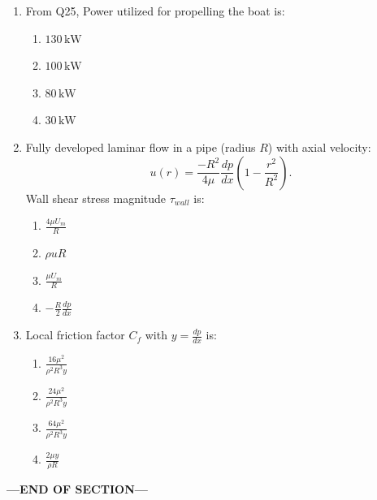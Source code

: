 \documentclass[journal,cmex10]{IEEEtran}
\theoremstyle{remark}
\numberwithin{equation}{enumi}
\numberwithin{figure}{enumi}
\begin{document}
\begin{enumerate}[label=\arabic*)]
\vspace{0.5cm}
\item From Q25, Power utilized for propelling the boat is:  
\hfill{}

\begin{enumerate}[label=\alph*)]
    \item $130\,\text{kW}$
    \item $100\,\text{kW}$
    \item $80\,\text{kW}$
    \item $30\,\text{kW}$
\end{enumerate}

\newpage
\item Fully developed laminar flow in a pipe (radius $R$) with axial velocity:  
\[
u(r) = \frac{-R^2}{4\mu} \frac{dp}{dx} \left(1 - \frac{r^2}{R^2}\right).
\]  
Wall shear stress magnitude $\tau_{wall}$ is:  
\hfill{}

\begin{enumerate}[label=\alph*)]
    \item $\frac{4 \mu U_m}{R}$
    \item $\rho u R$
    \item $\frac{\mu U_m}{R}$
    \item $-\frac{R}{2} \frac{dp}{dx}$
\end{enumerate}

\vspace{0.5cm}
\item Local friction factor $C_f$ with $y = \frac{dp}{dx}$ is:  
\hfill{}

\begin{enumerate}[label=\alph*)]
    \item $\frac{16 \mu^2}{\rho^2 R^3 y}$
    \vspace{0.1cm}
    \item $\frac{24 \mu^2}{\rho^2 R^3 y}$
    \vspace{0.1cm}
    \item $\frac{64 \mu^2}{\rho^2 R^3 y}$
    \vspace{0.1cm}
    \item $\frac{2 \mu y}{\rho R}$
\end{enumerate}

\end{enumerate}
\bigskip

    \vspace{1\baselineskip}
    \begin{center}
    \textbf{\Large ---END OF SECTION---}
    \end{center}
\end{document}
